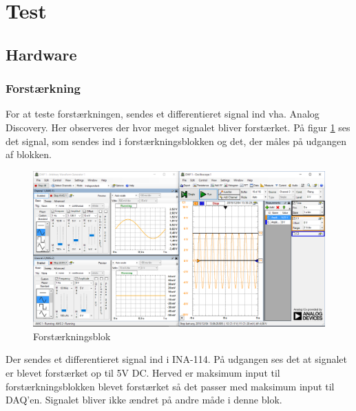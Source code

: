 \section{Test}
\subsection{Hardware}
\subsubsection{Forstærkning}
For at teste forstærkningen, sendes et differentieret signal ind vha. Analog Discovery. Her observeres der hvor meget signalet bliver forstærket. 
På figur \ref{fig:forstaerkning} ses det signal, som sendes ind i forstærkningsblokken og det, der måles på udgangen af blokken. 
\begin{figure}[H]
	\centering
	\includegraphics[width=1.0\textwidth]{Figurer/forst_blok}
	\caption{Forstærkningsblok}
	\label{fig:forstaerkning}
\end{figure}
Der sendes et differentieret signal ind i INA-114. På udgangen ses det at signalet er blevet forstærket op til 5V DC. Herved er maksimum input til forstærkningsblokken blevet forstærket så det passer med maksimum input til DAQ'en. Signalet bliver ikke ændret på andre måde i denne blok.

